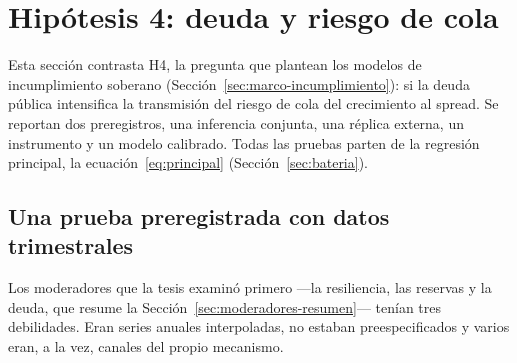 \section{Hipótesis 4: deuda y riesgo de cola}
\label{sec:hallazgo-central}

Esta sección contrasta H4, la pregunta que plantean los modelos de incumplimiento soberano (Sección~\ref{sec:marco-incumplimiento}): si la deuda pública intensifica la transmisión del riesgo de cola del crecimiento al spread. Se reportan dos preregistros, una inferencia conjunta, una réplica externa, un instrumento y un modelo calibrado. Todas las pruebas parten de la regresión principal, la ecuación~\eqref{eq:principal} (Sección~\ref{sec:bateria}).

\subsection{Una prueba preregistrada con datos trimestrales}
\label{sec:resiliencia-prereg}

Los moderadores que la tesis examinó primero ---la resiliencia, las reservas y la deuda, que resume la Sección~\ref{sec:moderadores-resumen}--- tenían tres debilidades. Eran series anuales interpoladas, no estaban preespecificados y varios eran, a la vez, canales del propio mecanismo.

